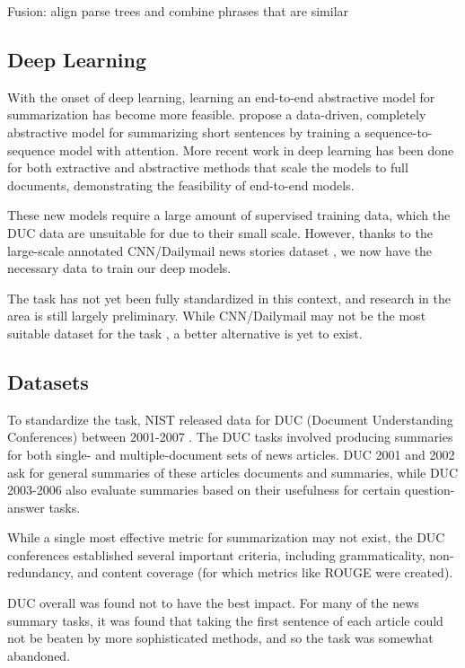\documentclass[11pt]{report}
\begin{document}
Fusion: align parse trees and combine phrases that are similar %


\subsection{Deep Learning}

With the onset of deep learning, learning an end-to-end abstractive model for summarization has become more feasible. \citet{rush2015neural} propose a data-driven, completely abstractive model for summarizing short sentences by training a sequence-to-sequence model with attention. More recent work in deep learning has been done for both extractive \citep{} %
and abstractive \citep{nallapati2016seq2seq, ramachandran2016} methods that scale the models to full documents, demonstrating the feasibility of end-to-end models.

These new models require a large amount of supervised training data, which the DUC data are unsuitable for due to their small scale. However, thanks to the large-scale annotated CNN/Dailymail news stories dataset \cite{Hermann2015}, we now have the necessary data to train our deep models.

The task has not yet been fully standardized in this context, and research in the area is still largely preliminary. While CNN/Dailymail may not be the most suitable dataset for the task \citep{Chen2016}, a better alternative is yet to exist.


\subsection{Datasets}

To standardize the task, NIST released data for DUC (Document Understanding Conferences) between 2001-2007 \citep{over2007duc}. The DUC tasks involved producing summaries for both single- and multiple-document sets of news articles. DUC 2001 and 2002 ask for general summaries of these articles documents and summaries, while DUC 2003-2006 also evaluate summaries based on their usefulness for certain question-answer tasks. %

While a single most effective metric for summarization may not exist, the DUC conferences established several important criteria, including grammaticality, non-redundancy, and content coverage (for which metrics like ROUGE \citep{lin2004rouge} were created).

DUC overall was found not to have the best impact. For many of the news summary tasks, it was found that taking the first sentence of each article could not be beaten by more sophisticated methods, and so the task was somewhat abandoned.
\end{document}
